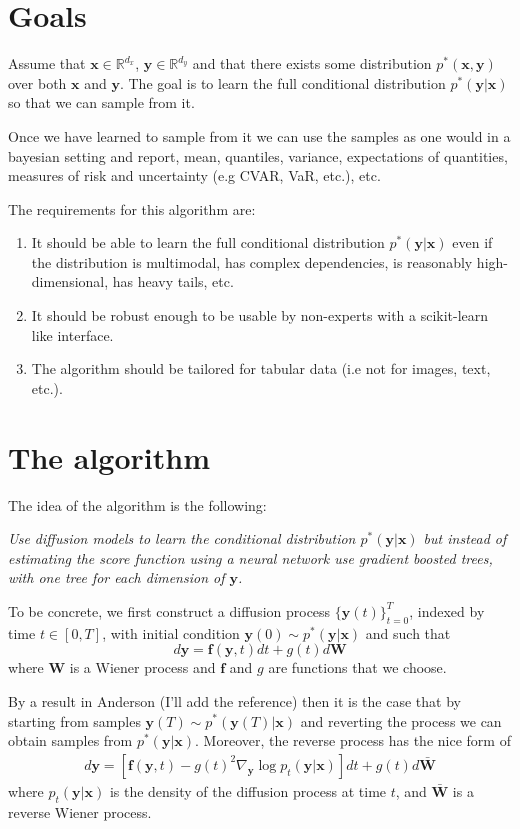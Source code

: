 \section{Goals}

Assume that $\mathbf{x} \in \mathbb{R}^{d_x}$, $\mathbf{y} \in \mathbb{R}^{d_y}$
and that there exists some distribution $p^*(\mathbf{x}, \mathbf{y})$ over both $\mathbf{x}$ and $\mathbf{y}$.
The goal is to learn the full conditional distribution $p^*(\mathbf{y}|\mathbf{x})$ so that we can sample from it.

Once we have learned to sample from it we can use the samples as one would in a bayesian setting and report, mean,
quantiles, variance, expectations of quantities, measures of risk and uncertainty (e.g CVAR, VaR, etc.), etc.

The requirements for this algorithm are:
\begin{enumerate}
    \item It should be able to learn the full conditional distribution $p^*(\mathbf{y}|\mathbf{x})$
    even if the distribution is multimodal, has complex dependencies, is reasonably high-dimensional,
    has heavy tails, etc.
    \item It should be robust enough to be usable by non-experts with a scikit-learn like interface.
    \item The algorithm should be tailored for tabular data (i.e not for images, text, etc.).
\end{enumerate}


\section{The algorithm}
The idea of the algorithm is the following:
\vskip 0.1in

\textit{Use diffusion models to learn the conditional distribution $p^*(\mathbf{y}|\mathbf{x})$
but instead of estimating the score function using a neural network use gradient
boosted trees, with one tree for each dimension of $\mathbf{y}$.}
\vskip 0.1in


To be concrete, we first construct a diffusion process $\{ \mathbf{y}(t)\}_{t=0}^T$,
indexed by time $t \in [0, T]$, with initial condition $\mathbf{y}(0) \sim p^*(\mathbf{y}|\mathbf{x})$
and such that
\[ d \mathbf{y} = \mathbf{f}(\mathbf{y}, t) dt + g(t) d \mathbf{W} \]
where $\mathbf{W}$ is a Wiener process and $\mathbf{f}$ and $g$ are functions that we
choose.
\vskip 0.1in

By a result in Anderson (I'll add the reference) then it is the case that by starting from samples
$\mathbf{y}(T) \sim p^*(\mathbf{y}(T)|\mathbf{x})$ and reverting the process
we can obtain samples from $p^*(\mathbf{y}|\mathbf{x})$.
Moreover, the reverse process has the nice form of
\begin{align*}
\label{eq:reverse_process}
d \mathbf{y} = [\mathbf{f}(\mathbf{y}, t) - g(t)^2 \nabla_{\mathbf{y}} \log p_t(\mathbf{y}| \mathbf{x})] dt +  g(t) d \mathbf{\bar{W}}
\end{align*}
where $p_t(\mathbf{y}| \mathbf{x})$ is the density of the diffusion process at time $t$, and $\mathbf{\bar{W}}$ is a reverse Wiener process.
\vskip 0.1in

